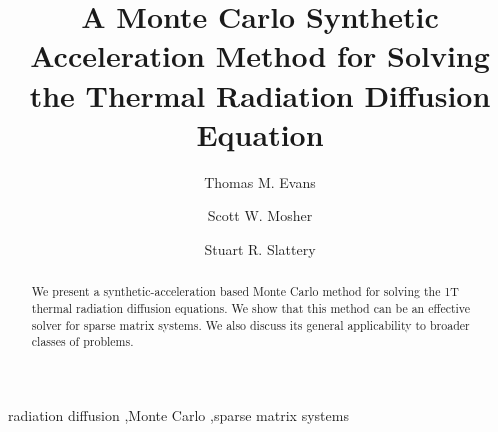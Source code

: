 \documentclass[preprint,12pt]{elsarticle}
\begin{document}
\begin{frontmatter}


  \title{A Monte Carlo Synthetic Acceleration Method for Solving the
    Thermal Radiation Diffusion Equation}

  \author[ornl]{Thomas M. Evans}

  \author[ornl]{Scott W. Mosher}

  \author[wisc]{Stuart R. Slattery}


  \address[ornl]{Oak Ridge National Laboratory, 
    1 Bethel Valley Rd., Oak Ridge, TN 378131 U.S.A.}
  \address[wisc]{University of Wisconsin-Madison, 1500 Engineering
    Dr., Madison, WI 53716 U.S.A.}

  \begin{abstract}

    We present a synthetic-acceleration based Monte Carlo method for
    solving the 1T thermal radiation diffusion equations.  We show
    that this method can be an effective solver for sparse matrix
    systems.  We also discuss its general applicability to broader
    classes of problems.

  \end{abstract}

  \begin{keyword}
    radiation diffusion \sep Monte Carlo \sep sparse matrix systems

  \end{keyword}

\end{frontmatter}


\end{document}
